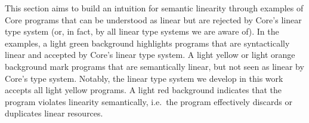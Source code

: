 \documentclass[acmsmall,review,anonymous,screen]{acmart}
\newcommand{\workingcolorname}{light green}
\newcommand{\notyetcolorname}{light yellow}
\newcommand{\nowaycolorname}{light red}
\newcommand{\limitationcolorname}{light orange}
\begin{document}
This section aims to build an intuition for semantic linearity through examples
of Core programs that can be understood as linear but are rejected by Core's
linear type system (or, in fact, by all linear type systems we are aware of).
%
%
%
In the examples, a \colorbox{working}{\workingcolorname} background highlights
programs that are syntactically linear and accepted by Core's linear type
system.
%
A \colorbox{notyet}{\notyetcolorname} or
\colorbox{limitation}{\limitationcolorname} background mark programs that are
semantically linear, but not seen as linear by Core's type system.
%
Notably, the linear type system we develop in this work accepts all
\colorbox{notyet}{\notyetcolorname} programs.
%
A \colorbox{noway}{\nowaycolorname} background indicates that the program
violates linearity semantically, i.e.~the program effectively
discards or duplicates linear resources.


\end{document}
